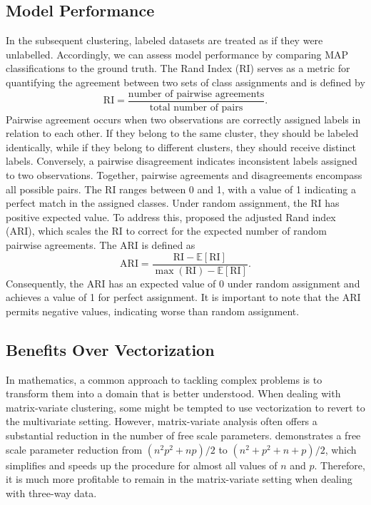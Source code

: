 \documentclass[12pt]{report}
\begin{document}
\subsection{Model Performance}
In the subsequent clustering, labeled datasets are treated as if they were unlabelled. Accordingly, we can assess model performance by comparing MAP classifications to the ground truth. The Rand Index (RI) \citep{rand1971} serves as a metric for quantifying the agreement between two sets of class assignments and is defined by
\begin{equation*}
\text{RI} = \frac{\text{number of pairwise agreements}}{\text{total number of pairs}}.
\end{equation*} 
Pairwise agreement occurs when two observations are correctly assigned labels in relation to each other. If they belong to the same cluster, they should be labeled identically, while if they belong to different clusters, they should receive distinct labels. Conversely, a pairwise disagreement indicates inconsistent labels assigned to two observations. Together, pairwise agreements and disagreements encompass all possible pairs. The RI ranges between 0 and 1, with a value of 1 indicating a perfect match in the assigned classes. Under random assignment, the RI has positive expected value. To address this, \citet{hubert1985} proposed the adjusted Rand index (ARI), which scales the RI to correct for the expected number of random pairwise agreements. The ARI is defined as 
\begin{equation*}
\text{ARI} = \frac{\text{RI}  - \mathbb{E}[\text{RI} ]}{\max(\text{RI}) - \mathbb{E}[\text{RI} ]}.
\end{equation*} 
Consequently, the ARI has an expected value of 0 under random assignment and achieves a value of 1 for perfect assignment. It is important to note that the ARI permits negative values, indicating worse than random assignment.




\subsection{Benefits Over Vectorization}
In mathematics, a common approach to tackling complex problems is to transform them into a domain that is better understood. When dealing with matrix-variate clustering, some might be tempted to use vectorization to revert to the multivariate setting. However, matrix-variate analysis often offers a substantial reduction in the number of free scale parameters. \citet{gallaugher2018} demonstrates a free scale parameter reduction from $(n^2p^2 + np)/2$ to $(n^2 + p^2 + n + p)/2$, which simplifies and speeds up the procedure for almost all values of $n$ and $p$. Therefore, it is much more profitable to remain in the matrix-variate setting when dealing with three-way data. 
\end{document}
